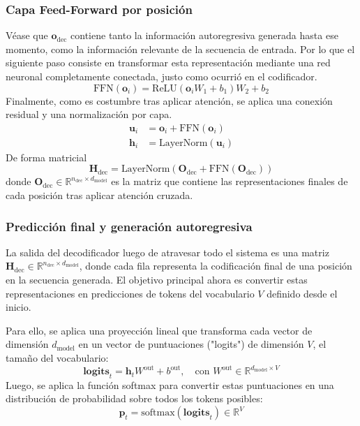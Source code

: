 \documentclass[12pt,letterpaper]{article}
\begin{document}
\subsubsection{Capa Feed-Forward por posición}
Véase que $\textbf{o}_{\text{dec}}$ contiene tanto la información autoregresiva generada hasta ese momento, como la información relevante de la secuencia de entrada. Por lo que el siguiente paso consiste en transformar esta representación mediante una red neuronal completamente conectada, justo como ocurrió en el codificador.
\begin{equation}
\text{FFN}(\textbf{o}_i) = \text{ReLU}(\textbf{o}_i W_1 + b_1) W_2 + b_2
\end{equation}
Finalmente, como es costumbre tras aplicar atención, se aplica una conexión residual y una normalización por capa.
\begin{align}
\textbf{u}_i &= \textbf{o}_i + \text{FFN}(\textbf{o}_i) \\
\textbf{h}_i &= \text{LayerNorm}(\textbf{u}_i)
\end{align}
De forma matricial
\begin{equation}
\textbf{H}_{\text{dec}} = \text{LayerNorm}(\textbf{O}_{\text{dec}} + \text{FFN}(\textbf{O}_{\text{dec}}))
\end{equation}
donde \( \textbf{O}_{\text{dec}} \in \mathbb{R}^{n_{\text{dec}} \times d_{\text{model}}} \) es la matriz que contiene las representaciones finales de cada posición tras aplicar atención cruzada.

\subsubsection{Predicción final y generación autoregresiva}
La salida del decodificador luego de atravesar todo el sistema es una matriz \( \textbf{H}_{\text{dec}} \in \mathbb{R}^{n_{\text{dec}} \times d_{\text{model}}} \), donde cada fila representa la codificación final de una posición en la secuencia generada. El objetivo principal ahora es convertir estas representaciones en predicciones de tokens del vocabulario $V$ definido desde el inicio.

Para ello, se aplica una proyección lineal que transforma cada vector de dimensión \( d_{\text{model}} \) en un vector de puntuaciones ("logits") de dimensión \( V \), el tamaño del vocabulario:
\begin{equation}
\textbf{logits}_t = \textbf{h}_t W^{\text{out}} + b^{\text{out}}, \quad \text{con } W^{\text{out}} \in \mathbb{R}^{d_{\text{model}} \times V}
\end{equation}
Luego, se aplica la función softmax para convertir estas puntuaciones en una distribución de probabilidad sobre todos los tokens posibles:
\begin{equation}
\textbf{p}_t = \text{softmax}(\textbf{logits}_t) \in \mathbb{R}^{V}
\end{equation}
\end{document}
